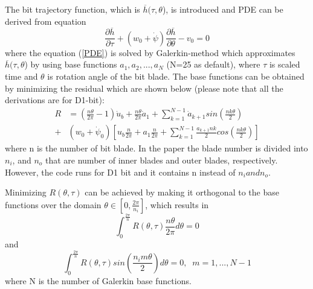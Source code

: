 The bit trajectory function, which is $\overline{h}(\tau, \theta$), is introduced and PDE can be derived from equation
\begin{equation}\label{PDE}
\frac{\partial \overline{h}}{\partial \tau} + (w_0 + \dot{\psi})\frac{\partial \overline{h}}{\partial \theta}-v_0 = 0
\end{equation}
where the equation (\ref{PDE}) is solved by Galerkin-method which approximates $\overline{h}(\tau, \theta$) by using base functions $a_1, a_2, ..., a_N$ (N=25 as default), where $\tau$ is scaled time and $\theta$ is rotation angle of the bit blade. The base functions can be obtained by minimizing the residual which are shown below (please note that all the derivations are for D1-bit):
\begin{equation}\label{GM}
\begin{split}
R &= \left(\frac{n \theta}{2 \pi}-1\right)\dot{u}_b + \frac{n \theta}{2 \pi}\dot{a}_1 + \sum_{k=1}^{N-1}\dot{a}_{k+1}sin\left(\frac{nk\theta}{2}\right) \\ + &(w_0 + \dot{\psi}_0)\left[u_b\frac{n}{2\pi}+a_1\frac{n}{2\pi} + \sum_{k=1}^{N-1}\frac{a_{k+1}nk}{2}cos\left(\frac{nk\theta}{2}\right)\right]
\end{split}
\end{equation}
where n is the number of bit blade. In the paper the blade number is divided into $n_i$, and $n_o$ that are number of inner blades and outer blades, respectively. However, the code runs for D1 bit and it contains n instead of $n_i and n_o$.

Minimizing $R(\theta, \tau)$ can be achieved by making it orthogonal to the base functions over the domain $\theta \in \left[0, \frac{2\pi}{n_i}\right]$, which results in
\begin{equation}\label{GM1}
 \int_{0}^{\frac{2\pi}{n}}R(\theta,\tau)\frac{n\theta}{2\pi}d\theta = 0
\end{equation}
and
\begin{equation}\label{GM2}
 \int_{0}^{\frac{2\pi}{n}}R(\theta, \tau)sin\left(\frac{n_im\theta}{2}\right)d\theta=0, \;\; m= 1,...,N-1
\end{equation}
where N is the number of Galerkin base functions.

